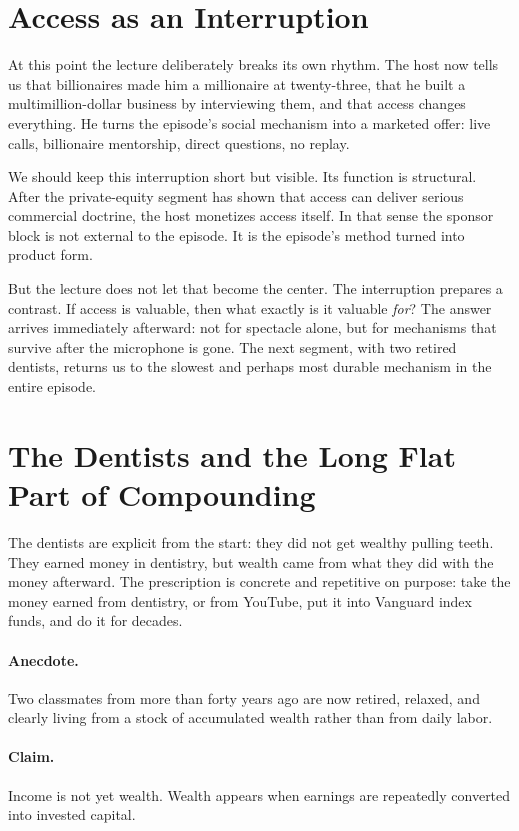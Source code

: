 \section{Access as an Interruption}

At this point the lecture deliberately breaks its own rhythm. The host now tells us that billionaires made him a millionaire at twenty-three, that he built a multimillion-dollar business by interviewing them, and that access changes everything. He turns the episode's social mechanism into a marketed offer: live calls, billionaire mentorship, direct questions, no replay.

We should keep this interruption short but visible. Its function is structural. After the private-equity segment has shown that access can deliver serious commercial doctrine, the host monetizes access itself. In that sense the sponsor block is not external to the episode. It is the episode's method turned into product form.

But the lecture does not let that become the center. The interruption prepares a contrast. If access is valuable, then what exactly is it valuable \emph{for}? The answer arrives immediately afterward: not for spectacle alone, but for mechanisms that survive after the microphone is gone. The next segment, with two retired dentists, returns us to the slowest and perhaps most durable mechanism in the entire episode.

\section{The Dentists and the Long Flat Part of Compounding}

The dentists are explicit from the start: they did not get wealthy pulling teeth. They earned money in dentistry, but wealth came from what they did with the money afterward. The prescription is concrete and repetitive on purpose: take the money earned from dentistry, or from YouTube, put it into Vanguard index funds, and do it for decades.

\paragraph{Anecdote.} Two classmates from more than forty years ago are now retired, relaxed, and clearly living from a stock of accumulated wealth rather than from daily labor.

\paragraph{Claim.} Income is not yet wealth. Wealth appears when earnings are repeatedly converted into invested capital.

